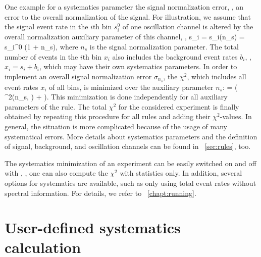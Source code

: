  One example for a systematics parameter the signal normalization error, \ie, an error to the overall normalization of the signal. For illustration, we assume that the signal event rate in the $i$th bin $s_i^0$ of one oscillation channel is altered by the overall normalization auxiliary parameter of this channel, \ie , 
\be
 s_i = s_i(n_s) = s_i^0 \cdot (1 + n_s),
\ee
where $n_s$ is the signal normalization parameter. The total number of events in the $i$th bin $x_i$ also includes the background event rates $b_i$, \ie, $x_i = s_i + b_i$, which may have their own systematics parameters.
In order to implement an overall signal normalization error $\sigma_{n_s}$,  the $\chi^2$, which includes all event rates $x_i$ of all bins, is minimized over the auxiliary parameter $n_s$:
\be
  =  \left(  \chi^2(n_s, \hdots) +  \right).
\ee 
This minimization is done independently for all auxiliary parameters of the rule. The total $\chi^2$ for the considered experiment is finally obtained by repeating this procedure for all rules and adding their $\chi^2$-values. In general, the situation is more complicated because of the usage of many systematical errors. More details about systematics parameters and the definition of signal, background, and oscillation channels can be found in \Sec~\ref{sec:rules}, too.

The systematics minimization of an experiment can be easily switched on and off with , \ie, one can also compute the $\chi^2$ with statistics only. In addition, several options for 
systematics are available, such as only using total event rates without
spectral information. For details, we refer to \Chapt~\ref{chapt:running}.


\section{User-defined systematics calculation}
\label{sec:userchi}



